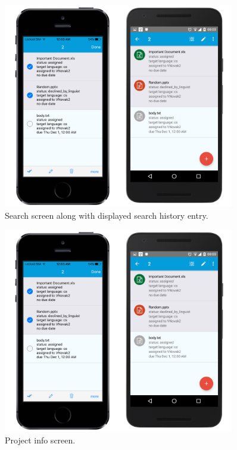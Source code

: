 \begin{figure}[]
	\includegraphics[width=0.9\textwidth]{pics/screenshots/projs}
	\caption{Search screen along with displayed search history entry.}
	\label{search}
\end{figure}

\begin{figure}[]
	\includegraphics[width=0.9\textwidth]{pics/screenshots/projs}
	\caption{Project info screen.}
	\label{projInfo}
\end{figure}



